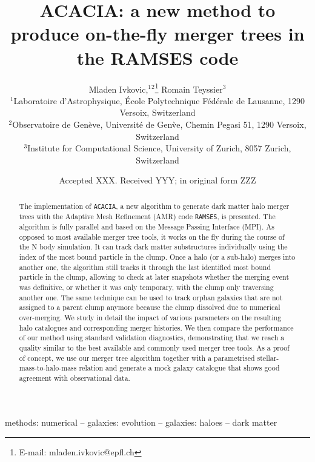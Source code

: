 \documentclass[a4paper,twocolumn,fleqn,usenatbib]{mnras}
\title[ACACIA]{{ACACIA}: a new method to produce on-the-fly merger trees in the RAMSES code }
\author[Mladen Ivkovic]{
    Mladen Ivkovic,$^{1}$$^{2}$\thanks{E-mail: mladen.ivkovic@epfl.ch}
    Romain Teyssier$^{3}$
    \\
    $^{1}$Laboratoire d'Astrophysique, \'Ecole Polytechnique F\'ed\'erale de Lausanne, 1290 Versoix, Switzerland\\
    $^{2}$Observatoire de Gen\`eve, Universit\'e de Gen\`ve, Chemin Pegasi 51, 1290 Versoix, Switzerland\\
    $^{3}$Institute for Computational Science, University of Zurich, 8057 Zurich, Switzerland\\
}
\date{Accepted XXX. Received YYY; in original form ZZZ}
\newcommand{\ramses}{\texttt{RAMSES}}
\begin{document}
    \label{firstpage}
    \pagerange{\pageref{firstpage}--\pageref{lastpage}}
    \maketitle

    \begin{abstract}
  The implementation of \texttt{ACACIA}, a new algorithm to generate
  dark matter halo merger trees with the Adaptive Mesh Refinement
  (AMR) code \ramses, is presented.  The algorithm is fully parallel
  and based on the Message Passing Interface (MPI). As opposed to most
  available merger tree tools, it works on the fly during the course
  of the N body simulation.  It can track dark matter substructures
  individually using the index of the most bound particle in the
  clump.  Once a halo (or a sub-halo) merges into another one, the
  algorithm still tracks it through the last identified most bound
  particle in the clump, allowing to check at later snapshots whether
  the merging event was definitive, or whether it was only temporary,
  with the clump only traversing another one.  The same technique can
  be used to track orphan galaxies that are not assigned to a parent
  clump anymore because the clump dissolved due to numerical
  over-merging.  We study in detail the impact of various parameters
  on the resulting halo catalogues and corresponding merger histories.
  We then compare the performance of our method using standard
  validation diagnostics, demonstrating that we reach a quality
  similar to the best available and commonly used merger tree tools.
  As a proof of concept, we use our merger tree algorithm together
  with a parametrised stellar-mass-to-halo-mass relation and generate
  a mock galaxy catalogue that shows good agreement with observational
  data.
\end{abstract}

    
    \begin{keywords}
    	methods: numerical -- galaxies: evolution -- galaxies: haloes -- dark matter
    \end{keywords}


     
    
    
    


    
\end{document}
